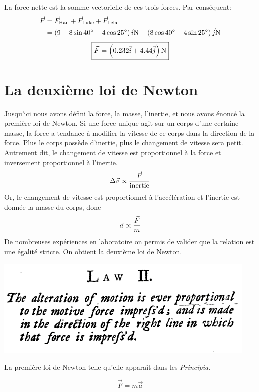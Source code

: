 La force nette est la somme vectorielle de ces trois forces.  Par
conséquent:
\begin{align*}
  \vF &= \vF_\mathrm{Han} + \vF_\mathrm{Luke} + \vF_\mathrm{Leia}  \\
      &= \left(9 -\num{8} \sin \SI{40}{\degree} -\num{4} \cos \SI{25}{\degree} \right) \xhat \si{N}
        +\left( \num{8} \cos \SI{40}{\degree} - \num{4} \sin \SI{25}{\degree}
        \right)\yhat \si{N}
\end{align*}
\[
  \boxed{\vF = \left( \num{0.232}\xhat + \num{4.44}\yhat \right) \si{N}}
\]


\section{La deuxième loi de Newton}

Jusqu'ici nous avons défini la force, la masse, l'inertie, et nous avons énoncé
la première loi de Newton.  Si une force unique agit sur un corps d'une
certaine masse, la force a tendance à modifier la vitesse de ce corps dans la
direction de la force.  Plus le corps possède d'inertie, plus le changement de
vitesse sera petit.  Autrement dit, le changement de vitesse est proportionnel
à la force et inversement proportionnel à l'inertie.
\[
  \Delta \vv \propto \frac{\vF}{\mathrm{inertie}} 
\]
Or, le changement de vitesse est proportionnel à l'accélération et l'inertie
est donnée la masse du corps, donc
\[
  \va \propto \frac{\vF}{m}
\]
De nombreuses expériences en laboratoire on permis de valider que la relation
est une égalité stricte.  On obtient la deuxième loi de Newton.
\begin{marginfigure}
  \begin{center}
    \includegraphics[scale=0.38]{./04_Dynamique/newton2ndlaw.png}
  \end{center}
  \caption{La première loi de Newton telle qu'elle apparaît dans les
    \textit{Principia}.}
  \label{fig:firstlaw}
\end{marginfigure}

\[
  \vec{F} = m\vec{a}
\]

